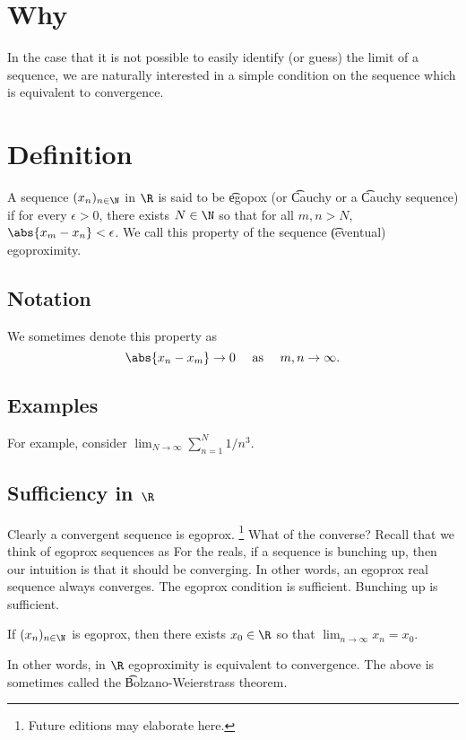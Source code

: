
\section*{Why}

In the case that it is not possible to easily identify (or guess) the limit of a sequence, we are naturally interested in a simple condition on the sequence which is equivalent to convergence.

\section*{Definition}

A sequence $(x_n)_{n \in \N }$ in $\R $ is said to be \t{egopox} (or \t{Cauchy} or a \t{Cauchy sequence}) if for every $\epsilon  > 0$, there exists $N \in \N $ so that for all $m, n > N$, $\abs{x_m - x_n} < \epsilon $.
We call this property of the sequence \t{(eventual) egoproximity}.

\subsection*{Notation}

We sometimes denote this property as
  \[
\abs{x_n - x_m} \to 0 \quad \text{ as } \quad m, n \to \infty.
  \]

\subsection*{Examples}

For example, consider $\lim_{N \to \infty} \sum_{n = 1}^{N} 1/n^3$.

\subsection*{Sufficiency in $\R $}

Clearly a convergent sequence is egoprox.
  \ifhmode\unskip\fi\footnote{
Future editions may elaborate here.
  }
What of the converse?
Recall that we think of egoprox sequences as 
For the reals, if a sequence is bunching up, then our intuition is that it should be converging.
In other words, an egoprox real sequence always converges.
The egoprox condition is sufficient.
Bunching up is sufficient.

\begin{proposition}If $(x_n)_{n \in \N }$ is egoprox, then there exists $x_0 \in \R $ so that $\lim_{n \to \infty} x_n = x_0$.\end{proposition}
In other words, in $\R $ egoproximity is equivalent to convergence.
The above is sometimes called the \t{Bolzano-Weierstrass theorem}.

\blankpage